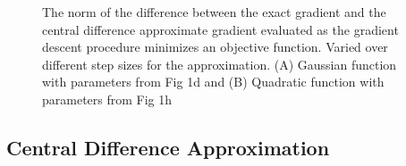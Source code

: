 \documentclass[10pt]{article}
\begin{document}
\begin{figure}[!h]
\centering
{}

\caption{The norm of the difference between the exact gradient and the central difference approximate gradient evaluated as the gradient descent procedure minimizes an objective function. Varied over different step sizes for the approximation. (A) Gaussian function with parameters from Fig 1d and (B) Quadratic function with parameters from Fig 1h}
\label{fig:1.2}
\end{figure}


\subsection{Central Difference Approximation}
\end{document}
